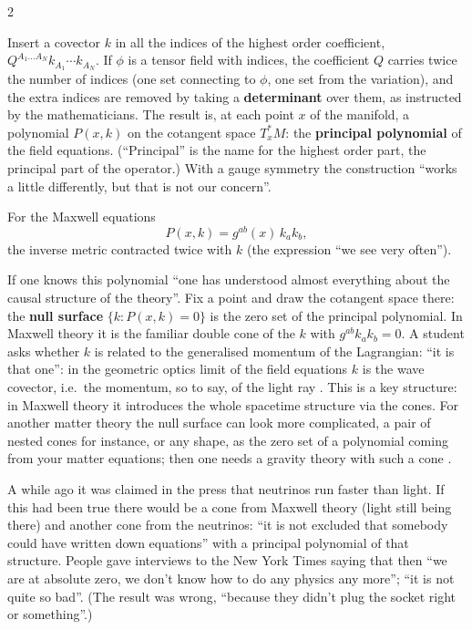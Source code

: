 \begin{paracol}{2}
\begin{definition}\label{def:c26-principal}
Insert a covector $k$ in all the indices of the highest order coefficient, $Q^{A_1\dots A_N}k_{A_1}\cdots k_{A_N}$. If $\phi$ is a tensor field with indices, the coefficient $Q$ carries twice the number of indices (one set connecting to $\phi$, one set from the variation), and the extra indices are removed by taking a \textbf{determinant} over them, as instructed by the mathematicians. The result is, at each point $x$ of the manifold, a polynomial $P(x,k)$ on the cotangent space $T_x^*M$: the \textbf{principal polynomial} of the field equations. (``Principal'' is the name for the highest order part, the principal part of the operator.) With a gauge symmetry the construction ``works a little differently, but that is not our concern''.
\end{definition}

\begin{example}\label{ex:c26-maxwell}
For the Maxwell equations
\[
  P(x,k)=g^{ab}(x)\,k_ak_b ,
\]
the inverse metric contracted twice with $k$ (the expression ``we see very often'').
\end{example}

If one knows this polynomial ``one has understood almost everything about the causal structure of the theory''. Fix a point and draw the cotangent space there: the \textbf{null surface} $\{k: P(x,k)=0\}$ is the zero set of the principal polynomial. In Maxwell theory it is the familiar double cone of the $k$ with $g^{ab}k_ak_b=0$. A student asks whether $k$ is related to the generalised momentum of the Lagrangian: ``it is that one'': in the geometric optics limit of the field equations $k$ is the wave covector, i.e.\ the momentum, so to say, of the light ray . This is a key structure: in Maxwell theory it introduces the whole spacetime structure via the cones. For another matter theory the null surface can look more complicated, a pair of nested cones for instance, or any shape, as the zero set of a polynomial coming from your matter equations; then one needs a gravity theory with such a cone .

\begin{aside}
A while ago it was claimed in the press that neutrinos run faster than light. If this had been true there would be a cone from Maxwell theory (light still being there) and another cone from the neutrinos: ``it is not excluded that somebody could have written down equations'' with a principal polynomial of that structure. People gave interviews to the New York Times saying that then ``we are at absolute zero, we don't know how to do any physics any more''; ``it is not quite so bad''. (The result was wrong, ``because they didn't plug the socket right or something''.) 
\end{aside}


\end{paracol}
